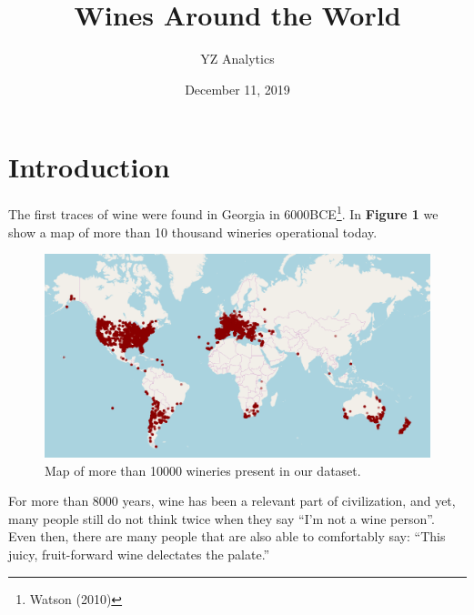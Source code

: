 \documentclass[12pt,twoside]{amherstthesis}
\title{Wines Around the World}
\author{YZ Analytics}
\date{December 11, 2019}
\begin{document}
\doublespace
  \maketitle

\frontmatter %

\pagestyle{fancyplain}






  \hypersetup{linkcolor=black}
  \setcounter{tocdepth}{2}
  \tableofcontents

%
%

\mainmatter %
\pagestyle{fancyplain} %

\chapter*{Introduction}\label{introduction}

The first traces of wine were found in Georgia in 6000BCE\footnote{Watson
  (2010)}. In \textbf{Figure 1} we show a map of more than 10 thousand
wineries operational today.
\begin{figure}[htbp]
\centering
\includegraphics[width=0.8\columnwidth]{../assets/wineries.png}
\caption{Map of more than 10000 wineries present in our dataset.}
\end{figure}
For more than 8000 years, wine has been a relevant part of civilization,
and yet, many people still do not think twice when they say ``I'm not a
wine person''. Even then, there are many people that are also able to
comfortably say: ``This juicy, fruit-forward wine delectates the
palate.''
\end{document}
